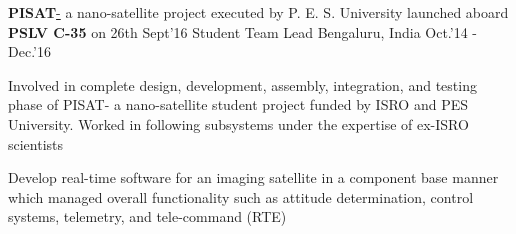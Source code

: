 \begin{cventries}
	\cventry
	{\textbf{PISAT}\href{http://pisat.pes.edu/}- a nano-satellite project executed by P. E. S. University launched aboard \textbf{PSLV C-35} on 26th Sept'16}
	{Student Team Lead}
	{Bengaluru, India}
	{Oct.'14 - Dec.'16}
	{
		\begin{cvitems}
		\item{Involved in complete design, development, assembly, integration, and testing phase of PISAT- a nano-satellite student project funded by ISRO and PES University. Worked in following subsystems under the expertise of ex-ISRO scientists}
		\item{Develop real-time software for an imaging satellite in a component base manner which managed overall functionality such as attitude determination, control systems, telemetry, and tele-command (RTE)}
		\end{cvitems}
	}
\end{cventries}
